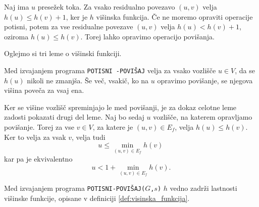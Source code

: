 \documentclass[mat1]{fmfdelo}
\begin{document}
\begin{dokaz}
Naj ima $u$ presežek toka. Za vsako residualno povezavo $(u,v)$ velja $h(u) \leq h(v) + 1$, ker je $h$ višinska funkcija. Če ne moremo opraviti operacije potisni, potem za vse residualne povezave $(u,v)$ velja $h(u) < h(v)+1$, oziroma $h(u) \leq h(v)$. Torej lahko opravimo operacijo povišanja.
\end{dokaz}

Oglejmo si tri leme o višinski funkciji.

\begin{lema}\label{lem:visina_ne_pada}
Med izvajanjem programa \texttt{POTISNI -POVIŠAJ} velja za vsako vozlišče $u \in V$, da se $h(u)$ nikoli ne zmanjša. Še več, vsakič, ko na $u$ opravimo povišanje, se njegova višina poveča za vsaj ena.
\end{lema}

\begin{dokaz}
Ker se višine vozlišč spreminjajo le med povišanji, je za dokaz celotne leme zadosti pokazati drugi del leme. Naj bo sedaj $u$ vozlišče, na katerem opravljamo povišanje. Torej za vse $v \in V$, za katere je $(u,v) \in E_f$, velja $h(u) \leq h(v)$. Ker to velja za vsak $v$, velja tudi \[u \leq \min_{(u,v) \in E_f} h(v)\,\] kar pa je ekvivalentno \[u < 1 + \min_{(u,v) \in E_f} h(v).\]
\end{dokaz}

\begin{lema}\label{lem:h_ostane_visinska}
Med izvajanjem programa \texttt{POTISNI-POVIŠAJ($G$,$s$)} $h$ vedno zadrži lastnosti višinske funkcije, opisane v definiciji \ref{def:visinska_funkcija}.
\end{lema}
\end{document}
